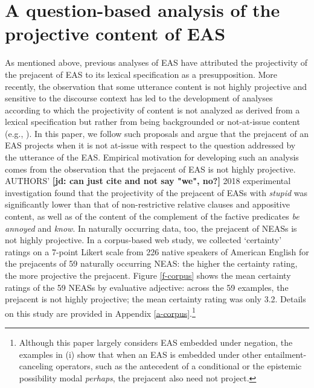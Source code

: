 \documentclass[11pt,fleqn]{article}
\newcommand{\6}{\mbox{$[\hspace*{-.6mm}[$}}
\newcommand{\9}{\mbox{$]\hspace*{-.6mm}]$}}
\newcommand{\jd}[1]{\textbf{\color{red}[jd: #1]}}
\begin{document}
\section{A question-based analysis of the projective content of EAS}\label{s2}

As mentioned above, previous analyses of EAS have attributed the projectivity of the prejacent of EAS to its lexical specification as a presupposition. More recently, the observation that some utterance content is not highly projective and sensitive to the discourse context has led to the development of analyses according to which the projectivity of content is not analyzed as derived from a lexical specification but rather from being backgrounded or not-at-issue content (e.g., \citealt{abrusan2011,abrusan2016,brst-salt10,best-question,brst-ar}). In this paper, we follow such proposals and argue that the prejacent of an EAS projects when it is not at-issue with respect to the question addressed by the utterance of the EAS. Empirical motivation for developing such an analysis comes from the observation that the prejacent of EAS is not highly projective.  AUTHORS' \jd{can just cite and not say "we", no?} 2018 experimental investigation found that the projectivity of the prejacent of EASs with {\em stupid} was significantly lower than that of non-restrictive relative clauses and appositive content, as well as of the content of the complement of the factive predicates {\em be annoyed} and {\em know}. In naturally occurring data, too, the prejacent of NEASs is not highly projective. In a corpus-based web study, we collected `certainty' ratings on a 7-point Likert scale from 226 native speakers of American English for the prejacents of 59 naturally occurring NEAS: the higher the certainty rating, the more projective the prejacent. Figure \ref{f-corpus} shows the mean certainty ratings of the 59 NEASs by evaluative adjective: across the 59 examples, the prejacent is not highly projective; the mean certainty rating was only 3.2. Details on this study are provided in Appendix \ref{a-corpus}.\footnote{Although this paper  largely considers EAS embedded under negation, the examples in (i) show that when an EAS is embedded under other entailment-canceling operators, such as the antecedent of a conditional or the epistemic possibility modal {\em perhaps}, the prejacent also need not project. 

}
\end{document}
